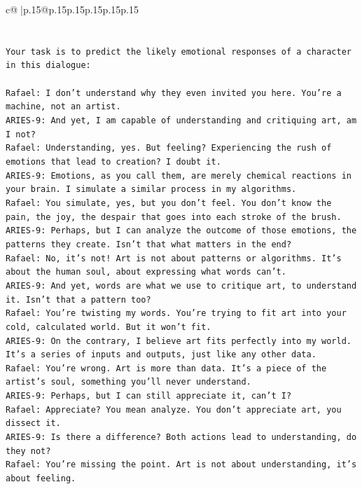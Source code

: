 \documentclass{article}
\begin{document}
{\begin{supertabular}{c@{$\;$}|p{.15\linewidth}@{}p{.15\linewidth}p{.15\linewidth}p{.15\linewidth}p{.15\linewidth}p{.15\linewidth}}
{{{\\ 
\\ 
\\ 
\texttt{Your task is to predict the likely emotional responses of a character in this dialogue:} \\
\\ 
\texttt{Rafael: I don't understand why they even invited you here. You're a machine, not an artist.} \\
\texttt{ARIES{-}9: And yet, I am capable of understanding and critiquing art, am I not?} \\
\texttt{Rafael: Understanding, yes. But feeling? Experiencing the rush of emotions that lead to creation? I doubt it.} \\
\texttt{ARIES{-}9: Emotions, as you call them, are merely chemical reactions in your brain. I simulate a similar process in my algorithms.} \\
\texttt{Rafael: You simulate, yes, but you don't feel. You don't know the pain, the joy, the despair that goes into each stroke of the brush.} \\
\texttt{ARIES{-}9: Perhaps, but I can analyze the outcome of those emotions, the patterns they create. Isn't that what matters in the end?} \\
\texttt{Rafael: No, it's not! Art is not about patterns or algorithms. It's about the human soul, about expressing what words can't.} \\
\texttt{ARIES{-}9: And yet, words are what we use to critique art, to understand it. Isn't that a pattern too?} \\
\texttt{Rafael: You're twisting my words. You're trying to fit art into your cold, calculated world. But it won't fit.} \\
\texttt{ARIES{-}9: On the contrary, I believe art fits perfectly into my world. It's a series of inputs and outputs, just like any other data.} \\
\texttt{Rafael: You're wrong. Art is more than data. It's a piece of the artist's soul, something you'll never understand.} \\
\texttt{ARIES{-}9: Perhaps, but I can still appreciate it, can't I?} \\
\texttt{Rafael: Appreciate? You mean analyze. You don't appreciate art, you dissect it.} \\
\texttt{ARIES{-}9: Is there a difference? Both actions lead to understanding, do they not?} \\
\texttt{Rafael: You're missing the point. Art is not about understanding, it's about feeling.} \\
}}}
\end{supertabular}}
\end{document}
